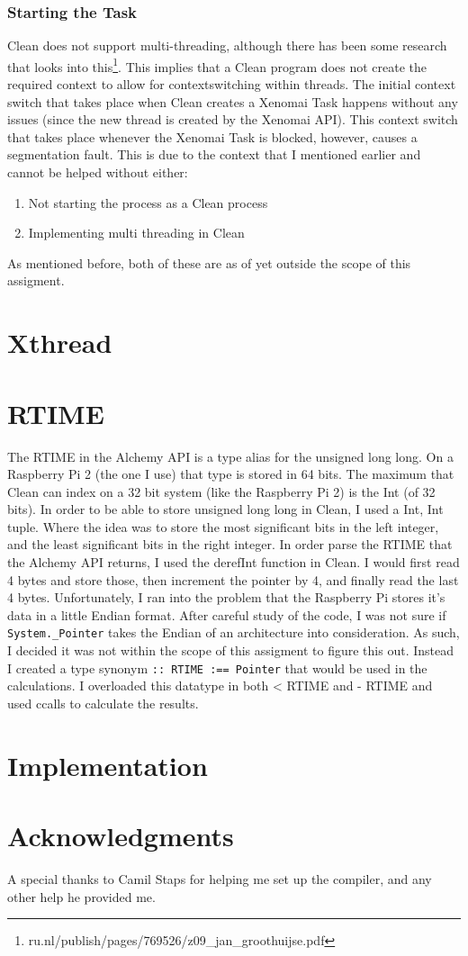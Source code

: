 \documentclass{scrartcl}
\begin{document}
\subsubsection{Starting the Task}
Clean does not support multi-threading, although there has been some research that looks into this\footnote{ru.nl/publish/pages/769526/z09\_jan\_groothuijse.pdf}.
This implies that a Clean program does not create the required context to allow for contextswitching within threads.
The initial context switch that takes place when Clean creates a Xenomai Task happens without any issues (since the new thread is created by the Xenomai API).
This context switch that takes place whenever the Xenomai Task is blocked, however, causes a segmentation fault.
This is due to the context that I mentioned earlier and cannot be helped without either:
\begin{enumerate}
	\item Not starting the process as a Clean process
	\item Implementing multi threading in Clean
\end{enumerate}
As mentioned before, both of these are as of yet outside the scope of this assigment.

\section{Xthread}

\section{RTIME}
The RTIME in the Alchemy API is a type alias for the unsigned long long.
On a Raspberry Pi 2 (the one I use) that type is stored in 64 bits.
The maximum that Clean can index on a 32 bit system (like the Raspberry Pi 2) is the Int (of 32 bits).
In order to be able to store unsigned long long in Clean, I used a Int, Int tuple.
Where the idea was to store the most significant bits in the left integer, and the least significant bits in the right integer.
In order parse the RTIME that the Alchemy API returns, I used the derefInt function in Clean.
I would first read 4 bytes and store those, then increment the pointer by 4, and finally read the last 4 bytes.
Unfortunately, I ran into the problem that the Raspberry Pi stores it's data in a little Endian format.
After careful study of the code, I was not sure if \texttt{System._Pointer} takes the Endian of an architecture into consideration.
As such, I decided it was not within the scope of this assigment to figure this out.
Instead I created a type synonym \texttt{:: RTIME :== Pointer} that would be used in the calculations.
I overloaded this datatype in both < RTIME and - RTIME and used ccalls to calculate the results.

\section{Implementation}

\section{Acknowledgments}
A special thanks to Camil Staps for helping me set up the compiler, and any other help he provided me.
\end{document}
